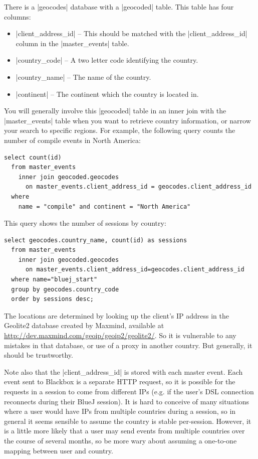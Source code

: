 \documentclass{report}
\begin{document}
There is a |geocodes| database with a |geocoded| table.  This table has four columns:
\begin{itemize}
\item |client_address_id| -- This should be matched with the |client_address_id| column
in the |master_events| table.
\item |country_code| -- A two letter code identifying the country.
\item |country_name| -- The name of the country.
\item |continent| -- The continent which the country is located in.
\end{itemize}

You will generally involve this |geocoded| table in an inner join with the |master_events| table when
you want to retrieve country information, or narrow your search to specific regions.  For example, the
following query counts the number of compile events in North America:

\begin{lstlisting}
select count(id)
  from master_events
    inner join geocoded.geocodes
      on master_events.client_address_id = geocodes.client_address_id
  where
    name = "compile" and continent = "North America"
\end{lstlisting}

This query shows the number of sessions by country:

\begin{lstlisting}
select geocodes.country_name, count(id) as sessions
  from master_events
    inner join geocoded.geocodes
      on master_events.client_address_id=geocodes.client_address_id
  where name="bluej_start"
  group by geocodes.country_code
  order by sessions desc; 
\end{lstlisting}

The locations are determined by looking up the client's IP address in the Geolite2 database created by Maxmind,
available at \url{http://dev.maxmind.com/geoip/geoip2/geolite2/}.  So it is vulnerable to any mistakes
in that database, or use of a proxy in another country.  But generally, it should be trustworthy.

Note also that the |client_address_id| is stored with each master event.  Each event sent to Blackbox is
a separate HTTP request, so it is possible for the requests in a session to come from different IPs (e.g. if the user's DSL
connection reconnects during their BlueJ session).  It is hard to conceive of many situations where a user
would have IPs from multiple countries during a session, so in general it seems sensible to assume the country
is stable per-session.  However, it is a little more likely that a user may send events from multiple countries
over the course of several months, so be more wary about assuming a one-to-one mapping between user and country.
\end{document}
